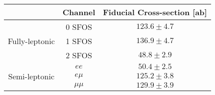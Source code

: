 \begin{tabular}{|cc||c|}
\hline
    & Channel & Fiducial Cross-section [ab] \\
\hline\hline
\multirow{3}{*}{Fully-leptonic}& 0 SFOS &  $123.6 \pm 4.7$        \\
&1 SFOS &  $136.9 \pm 4.7$           \\
&2 SFOS &  $48.8 \pm 2.9$          \\
\hline
\multirow{3}{*}{Semi-leptonic}& $ee$ &  $50.4 \pm 2.5$ \\
& $e\mu$ &  $125.2 \pm 3.8$ \\
& $\mu\mu$ &  $129.9 \pm 3.9$ \\
\hline
\end{tabular}
